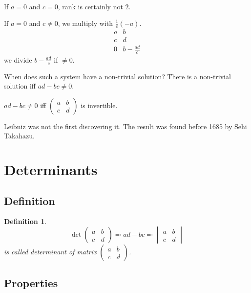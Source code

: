 \documentclass{article}
\newcounter{lecref}[section]
\numberwithin{lecref}{section}
\newtheorem{definition}[lecref]{Definition}
\begin{document}
If $a=0$ and $c=0$, rank is certainly not $2$.

If $a=0$ and $c \neq 0$, we multiply with $\frac1c (-a)$.
\[
  \begin{array}{cc}
    a & b \\
    c & d \\
  \hline
    0 & b-\frac{ad}{c}
  \end{array}
\]
we divide $b - \frac{ad}{c}$ if $\neq 0$.

When does such a system have a non-trivial solution?
There is a non-trivial solution iff $ad - bc \neq 0$.

$ad - bc \neq 0$ iff $\begin{pmatrix} a & b \\ c & d \end{pmatrix}$ is invertible.

Leibniz was not the first discovering it. The result was found before 1685 by Sehi Takahazu.

\section{Determinants}

\subsection{Definition}

\begin{definition} %
  \[ \det{\begin{pmatrix} a & b \\ c & d \end{pmatrix}} \eqqcolon ad - bc \eqqcolon \begin{vmatrix} a & b \\ c & d \end{vmatrix} \]
  is called \emph{determinant of matrix $\begin{pmatrix} a & b \\ c & d \end{pmatrix}$}.
\end{definition}

\subsection{Properties}
\end{document}

